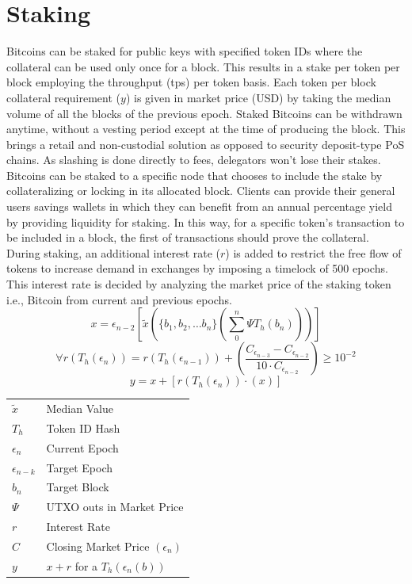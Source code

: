 \documentclass[a4paper,10pt]{article}
\makeatletter
\newenvironment{conditions}
  {\par\vspace{\abovedisplayskip}\noindent\begin{tabular}{>{$}l<{$} @{${}={}$} l}}
  {\end{tabular}\par\vspace{\belowdisplayskip}}
\makeatother
\begin{document}
\section{Staking}
Bitcoins can be staked for public keys with specified token IDs where the collateral can be used only once for a block. This results in a stake per token per block employing the throughput (tps) per token basis. Each token per block collateral requirement ($y$) is given in market price (USD) by taking the median volume of all the blocks of the previous epoch. Staked Bitcoins can be withdrawn anytime, without a vesting period except at the time of producing the block. This brings a retail and non-custodial solution as opposed to security deposit-type PoS chains. As slashing is done directly to fees, delegators won't lose their stakes. Bitcoins can be staked to a specific node that chooses to include the stake by collateralizing or locking in its allocated block. Clients can provide their general users savings wallets in which they can benefit from an annual percentage yield by providing liquidity for staking. In this way, for a specific token's transaction to be included in a block, the first of transactions should prove the collateral. During staking, an additional interest rate ($r$) is added to restrict the free flow of tokens to increase demand in exchanges by imposing a timelock of 500 epochs. This interest rate is decided by analyzing the market price of the staking token i.e., Bitcoin from current and previous epochs.
\begin{equation*}
x=\epsilon_{n-2}[\widetilde{x}( \{b_1, b_2, \dots b_n\} (\sum_0^n \Psi T_h(b_n)))]
\end{equation*}
\begin{equation*}
\forall r (T_h(\epsilon_n)) =  r(T_h(\epsilon_{n-1}))  +  (\frac{C_{\epsilon_{n-3}} - C_{\epsilon_{n-2}}}{10  \cdot  C_{\epsilon_{n-2}}}) \geq 10^{-2}
\end{equation*}
\begin{equation*}
y=x+ [r (T_h(\epsilon_n)) \cdot (x)]
\end{equation*}
\begin{conditions}
\widetilde{x} & Median Value\\
T_h & Token ID Hash\\
\epsilon_n & Current Epoch\\
\epsilon_{n-k} & Target Epoch\\
b_n & Target Block\\
\Psi & UTXO outs in Market Price\\
r & Interest Rate\\
C & Closing Market Price $(\epsilon_n)$\\
y & $x+r$ for a $T_h(\epsilon_{n}(b))$
\end{conditions}
\end{document}

